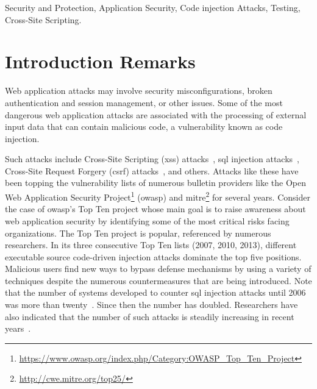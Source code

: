 \documentclass[conference]{IEEEtran}
\begin{document}
\begin{IEEEkeywords}
Security and Protection, Application Security, Code injection Attacks,
Testing, Cross-Site Scripting.
\end{IEEEkeywords}

\IEEEpeerreviewmaketitle

\section{Introduction Remarks}


Web application attacks may involve security misconfigurations, broken
authentication and session management, or other issues. Some of the
most dangerous web application attacks are associated with the
processing of external input data that can contain malicious code, a
vulnerability known as code injection.

Such attacks include Cross-Site Scripting ({\sc xss})
attacks~\cite{SG07}, {\sc sql} injection attacks~\cite{RL12b},
Cross-Site Request Forgery ({\sc csrf}) attacks~\cite{LZRL09}, and
others. Attacks like these have been topping the vulnerability lists
of numerous bulletin providers like the Open Web Application Security
Project\footnote{\url{https://www.owasp.org/index.php/Category:OWASP_Top_Ten_Project}}
({\sc owasp}) and {\sc
  mitre}\footnote{\url{http://cwe.mitre.org/top25/}} for several
years. Consider the case of {\sc owasp}'s Top Ten project whose main
goal is to raise awareness about web application security by
identifying some of the most critical risks facing organizations. The
Top Ten project is popular, referenced by numerous researchers. In its
three consecutive Top Ten lists (2007, 2010, 2013), different
executable source code-driven injection attacks dominate the top five
positions. Malicious users find new ways to bypass defense mechanisms
by using a variety of techniques despite the numerous countermeasures
that are being introduced. Note that the number of systems developed
to counter {\sc sql} injection attacks until 2006 was more than
twenty~\cite{HVO06}. Since then the number has doubled. Researchers
have also indicated that the number of such attacks is steadily
increasing in recent years~\cite{SSL12}.
\end{document}
